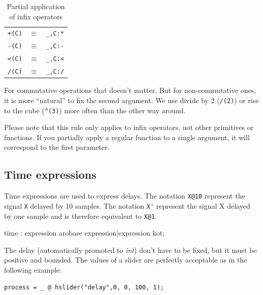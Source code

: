 \begin{table}[h]
	\begin{center}
	\begin{tabular}{|rcl|}
	\hline
	\lstinline'+(C)' & $\equiv$ & \lstinline'_,C:*'\\
	\lstinline'-(C)' & $\equiv$ & \lstinline'_,C:-'\\
	\lstinline'<(C)' & $\equiv$ & \lstinline'_,C:<'\\
	\lstinline'/(C)' & $\equiv$ & \lstinline'_,C:/'\\
	\hline
	\end{tabular}
	\end{center}
	\caption{Partial application of infix operators}
	\label{tab-partialrules}
	
\end{table}

For commutative operations that doesn't matter. But for non-commutative ones, it is more ``natural'' to fix the second argument.  We use divide by 2 (\lstinline'/(2)') or rise to the cube (\lstinline'^(3)') more often than the other way around.

Please note that this rule only applies to infix operators, not other primitives or functions. If you partially apply a regular function to a single argument, it will correspond to the first parameter.

\subsection{Time expressions}

Time expressions are used to express delays. The notation \lstinline'X@10' represent the signal \lstinline'X' delayed by 10 samples. The notation \lstinline"X'" represent the signal X delayed by one sample and is therefore equivalent to \lstinline'X@1'.

\begin{rail}
time : expression arobase expression|expression kot; 
\end{rail}

The delay (automatically promoted to \textit{int}) don't have to be fixed, but it must be positive and bounded. The values of a slider are perfectly acceptable as in the following example:

\begin{lstlisting}
process = _ @ hslider("delay",0, 0, 100, 1);
\end{lstlisting}

